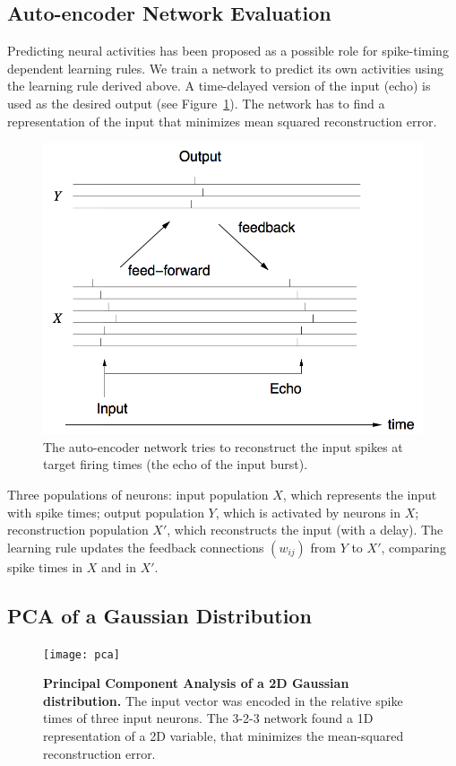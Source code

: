 \documentclass[final]{beamer}
\begin{document}
\begin{frame}[t]
\begin{multicols}{2}
\section{Auto-encoder Network Evaluation}

Predicting neural activities has been proposed as a possible role for spike-timing dependent learning rules. 
We train a network to predict its own activities using the learning rule derived above. 
A time-delayed version of the input (echo) is used as the desired output (see Figure~\ref{auto_encoder}). 
The network has to find a representation of the input that minimizes mean squared reconstruction error.

\begin{figure}
\centering
\includegraphics[width=0.5\columnwidth]{network}
\caption{The auto-encoder network tries to reconstruct the input spikes at target firing times (the echo of the input burst).
}
\label{auto_encoder}
\end{figure}

Three populations of neurons: input population $X$, which represents the input with spike times;
output population $Y$, which is activated by neurons in $X$;
reconstruction population $X'$, which reconstructs the input (with a delay).
The learning rule updates the feedback connections $(w_{ij})$ from $Y$ to $X'$, comparing spike times in $X$ and in $X'$.

\subsection{PCA of a Gaussian Distribution}

\begin{figure}
\centering
\texttt{[image: pca]}
\caption{\textbf{Principal Component Analysis of a 2D Gaussian distribution.} The input vector was encoded in the relative spike times of three input neurons. The 3-2-3 network found a 1D representation of a 2D variable, that minimizes the mean-squared reconstruction error.}
\label{pca_gaussian}
\end{figure}


\end{multicols}
\end{frame}
\end{document}
